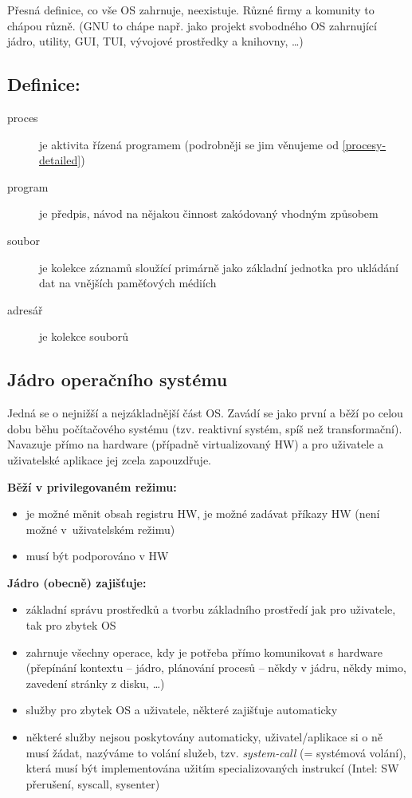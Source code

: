 \documentclass[a4paper, 11pt]{article}
\begin{document}
Přesná definice, co vše OS zahrnuje, neexistuje. Různé firmy a komunity to chápou různě. (GNU to chápe např. jako projekt svobodného OS zahrnující jádro, utility, GUI, TUI, vývojové prostředky a knihovny, \ldots)

\subsection*{Definice:} \label{procesy} \label{soubory}
\begin{description}
\item[proces] je aktivita řízená programem (podrobněji se jim věnujeme od \ref{procesy-detailed})
\item[program] je předpis, návod na nějakou činnost zakódovaný vhodným způsobem
\item[soubor] je kolekce záznamů sloužící primárně jako základní jednotka pro ukládání dat na vnějších paměťových médiích
\item[adresář] je kolekce souborů
\end{description}

\newpage
\subsection{Jádro operačního systému}
Jedná se o nejnižší a nejzákladnější část OS. Zavádí se jako první a běží po celou dobu běhu počítačového systému (tzv. reaktivní systém, spíš než transformační). Navazuje přímo na hardware (případně virtualizovaný HW) a pro uživatele a uživatelské aplikace jej zcela zapouzdřuje.

\textbf{Běží v privilegovaném režimu:}
\begin{itemize}
    \item je možné měnit obsah registru HW, je možné zadávat příkazy HW (není možné v~uživatelském režimu)
    \item musí být podporováno v HW
\end{itemize}

\textbf{Jádro (obecně) zajišťuje:}
\begin{itemize}
    \item základní správu prostředků a tvorbu základního prostředí jak pro uživatele, tak pro zbytek OS
    \item zahrnuje všechny operace, kdy je potřeba přímo komunikovat s hardware (přepínání kontextu -- jádro, plánování procesů -- někdy v jádru, někdy mimo, zavedení stránky z disku, \ldots)
    \item služby pro zbytek OS a uživatele, některé zajišťuje automaticky
    \item některé služby nejsou poskytovány automaticky, uživatel/aplikace si o ně musí žádat, nazýváme to volání služeb, tzv. \textit{system-call} \label{syscall} (= systémová volání), která musí být implementována užitím specializovaných instrukcí (Intel: SW přerušení, syscall, sysenter) \\
\end{itemize}
\end{document}
